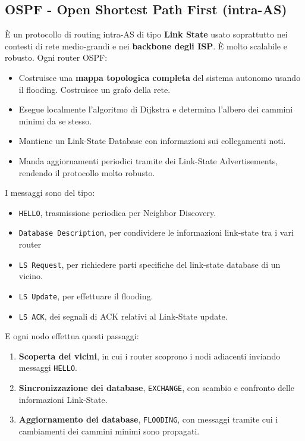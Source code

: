\newpage

\subsection{OSPF - Open Shortest Path First (intra-AS)}
È un protocollo di routing intra-AS di tipo \textbf{Link State} usato soprattutto nei contesti di rete medio-grandi e nei \textbf{backbone degli ISP}. È molto scalabile e robusto. Ogni router OSPF:
\begin{itemize}
	\item Costruisce una \textbf{mappa topologica completa} del sistema autonomo usando il flooding. Costruisce un grafo della rete.
	\item Esegue localmente l'algoritmo di Dijkstra e determina l'albero dei cammini minimi da se stesso.
	\item Mantiene un Link-State Database con informazioni sui collegamenti noti.
	\item Manda aggiornamenti periodici tramite dei Link-State Advertisements, rendendo il protocollo molto robusto.
\end{itemize}

I messaggi sono del tipo:
\begin{itemize}
	\item \verb|HELLO|, trasmissione periodica per Neighbor Discovery.
	\item \verb|Database Description|, per condividere le informazioni link-state tra i vari router
	\item \verb|LS Request|, per richiedere parti specifiche del link-state database di un vicino.
	\item \verb|LS Update|, per effettuare il flooding.
	\item \verb|LS ACK|, dei segnali di ACK relativi al Link-State update.
\end{itemize}

E ogni nodo effettua questi passaggi:
\begin{enumerate}
	\item \textbf{Scoperta dei vicini}, in cui i router scoprono i nodi adiacenti inviando messaggi \verb|HELLO|.
	\item \textbf{Sincronizzazione dei database}, \verb|EXCHANGE|, con scambio e confronto delle informazioni Link-State.
	\item \textbf{Aggiornamento dei database}, \verb|FLOODING|, con messaggi tramite cui i cambiamenti dei cammini minimi sono propagati.
\end{enumerate}

